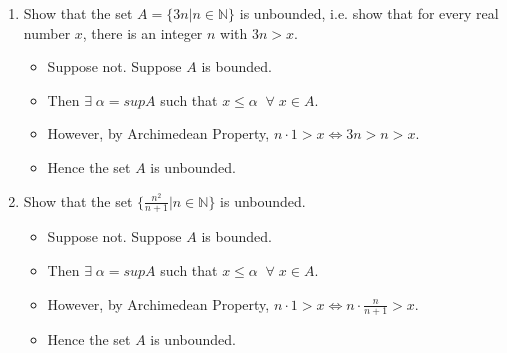 \documentclass[12pt]{article}
\begin{document}
\begin{enumerate}[label=(\roman*)]
    \item Show that the set $A = \{3n|n\in \mathbb{N}\}$ is unbounded, i.e. show that for every real number $x$, there is an integer $n$ with $3n>x$.
        \begin{itemize}
            \item Suppose not. Suppose $A$ is bounded.
            \item Then $\exists\; \alpha = supA$ such that $x \le \alpha\;\;\forall \; x\in A$.
            \item However, by Archimedean Property, $n\cdot 1 > x \Leftrightarrow 3n > n > x$.
            \item Hence the set $A$ is unbounded.
        \end{itemize}   
        
    \item Show that the set $\{\frac{n^2}{n+1}|n\in\mathbb{N}\}$ is unbounded.
        \begin{itemize}
            \item Suppose not. Suppose $A$ is bounded.
            \item Then $\exists\; \alpha = supA$ such that $x \le \alpha\;\;\forall\;x\in A$.
            \item However, by Archimedean Property, $n\cdot 1 > x \Leftrightarrow n\cdot \frac{n}{n+1} > x.$
            \item Hence the set $A$ is unbounded.
        \end{itemize}
    

\end{enumerate}
\end{document}
